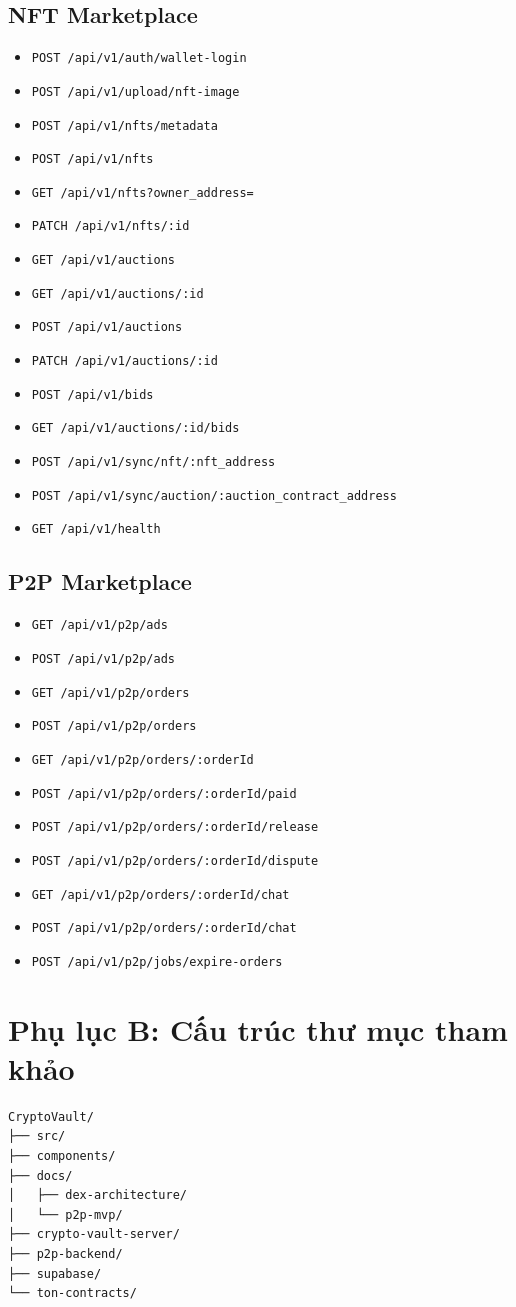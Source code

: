 \documentclass[a4paper,12pt]{report}
\begin{document}
\section*{NFT Marketplace}
\begin{itemize}
    \item \texttt{POST /api/v1/auth/wallet-login}
    \item \texttt{POST /api/v1/upload/nft-image}
    \item \texttt{POST /api/v1/nfts/metadata}
    \item \texttt{POST /api/v1/nfts}
    \item \texttt{GET /api/v1/nfts?owner\_address=}
    \item \texttt{PATCH /api/v1/nfts/:id}
    \item \texttt{GET /api/v1/auctions}
    \item \texttt{GET /api/v1/auctions/:id}
    \item \texttt{POST /api/v1/auctions}
    \item \texttt{PATCH /api/v1/auctions/:id}
    \item \texttt{POST /api/v1/bids}
    \item \texttt{GET /api/v1/auctions/:id/bids}
    \item \texttt{POST /api/v1/sync/nft/:nft\_address}
    \item \texttt{POST /api/v1/sync/auction/:auction\_contract\_address}
    \item \texttt{GET /api/v1/health}
\end{itemize}

\section*{P2P Marketplace}
\begin{itemize}
    \item \texttt{GET /api/v1/p2p/ads}
    \item \texttt{POST /api/v1/p2p/ads}
    \item \texttt{GET /api/v1/p2p/orders}
    \item \texttt{POST /api/v1/p2p/orders}
    \item \texttt{GET /api/v1/p2p/orders/:orderId}
    \item \texttt{POST /api/v1/p2p/orders/:orderId/paid}
    \item \texttt{POST /api/v1/p2p/orders/:orderId/release}
    \item \texttt{POST /api/v1/p2p/orders/:orderId/dispute}
    \item \texttt{GET /api/v1/p2p/orders/:orderId/chat}
    \item \texttt{POST /api/v1/p2p/orders/:orderId/chat}
    \item \texttt{POST /api/v1/p2p/jobs/expire-orders}
\end{itemize}

\chapter{Phụ lục B: Cấu trúc thư mục tham khảo}
\begin{verbatim}
CryptoVault/
├── src/
├── components/
├── docs/
│   ├── dex-architecture/
│   └── p2p-mvp/
├── crypto-vault-server/
├── p2p-backend/
├── supabase/
└── ton-contracts/
\end{verbatim}
\end{document}
